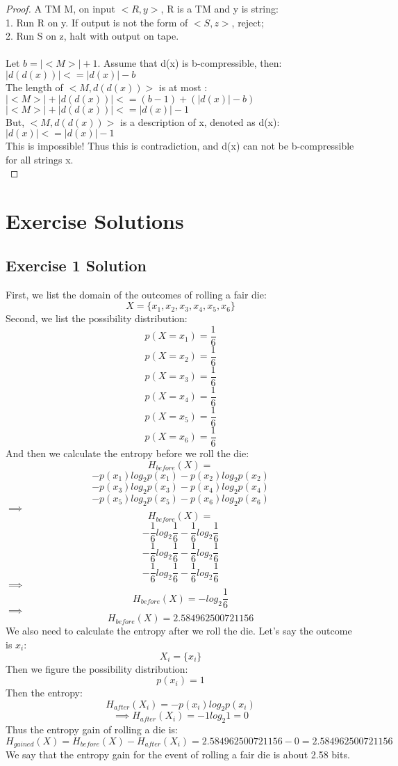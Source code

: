\documentclass[12pt]{article}
\begin{document}
\begin{proof}
A TM M, on input $<R,y>$, R is a TM and y is string:\\
    1. Run R on y. If output is not the form of $<S,z>$, reject;\\
    2. Run S on z, halt with output on tape.\\
\\
Let $b = |<M>| + 1$. Assume that d(x) is b-compressible, then:\\
    $|d(d(x))| <= |d(x)| - b$\\
The length of $<M, d(d(x))>$ is at most :\\
    $|<M>| + |d(d(x))| <= (b-1) + (|d(x)|-b)$\\
    $|<M>| + |d(d(x))| <= |d(x)| - 1$\\
But, $<M, d(d(x))>$ is a description of x, denoted as d(x):\\
    $|d(x)| <= |d(x)| - 1$\\
This is impossible! Thus this is contradiction, and d(x) can not be b-compressible for all strings x.\\
\end{proof}







\section{Exercise Solutions}

\subsection{Exercise 1 Solution}
First, we list the domain of the outcomes of rolling a fair die:
\[
	X = \{x_1, x_2, x_3, x_4, x_5, x_6\}
\]
Second, we list the possibility distribution:
\[
	p(X=x_1) = \frac{1}{6}
\]
\[
	p(X=x_2) = \frac{1}{6}
\]
\[
	p(X=x_3) = \frac{1}{6}
\]
\[
	p(X=x_4) = \frac{1}{6}
\]
\[
	p(X=x_5) = \frac{1}{6}
\]
\[
	p(X=x_6) = \frac{1}{6}
\]
And then we calculate the entropy before we roll the die:
\[
	H_{before}(X) = 
\]
\[
	-p(x_1)log_{2}p(x_1)  
	- p(x_2)log_{2}p(x_2)
\]
\[
	- p(x_3)log_{2}p(x_3)
	- p(x_4)log_{2}p(x_4)
\]
\[
	- p(x_5)log_{2}p(x_5)
	- p(x_6)log_{2}p(x_6)
\]
$\implies$
\[
	H_{before}(X) = 
\]
\[
	-\frac{1}{6}log_{2}\frac{1}{6}  
	-\frac{1}{6}log_{2}\frac{1}{6}  
\]
\[
	-\frac{1}{6}log_{2}\frac{1}{6}  
	-\frac{1}{6}log_{2}\frac{1}{6}  
\]
\[
	-\frac{1}{6}log_{2}\frac{1}{6}  
	-\frac{1}{6}log_{2}\frac{1}{6}  
\]
$\implies$
\[
	H_{before}(X) = 
	-log_{2}\frac{1}{6}  
\]
$\implies$
\[
	H_{before}(X) = 2.584962500721156 
\]
We also need to calculate the entropy after we roll the die.
Let's say the outcome is $x_i$:
\[
	X_i = \{x_i\}
\]
Then we figure the possibility distribution:
\[
	p(x_i) = 1
\]
Then the entropy:
\[
	H_{after}(X_i) = 
	-p(x_i)log_{2}p(x_i)  
\]
\[
\implies
	H_{after}(X_i) = 
	-1log_{2}1 = 0
\]  
Thus the entropy gain of rolling a die is:
\[
	H_{gained}(X) = H_{before}(X) - H_{after}(X_i) = 2.584962500721156 - 0 = 2.584962500721156
\]
We say that the entropy gain for the event of rolling a fair die is about 2.58 bits.
\end{document}
